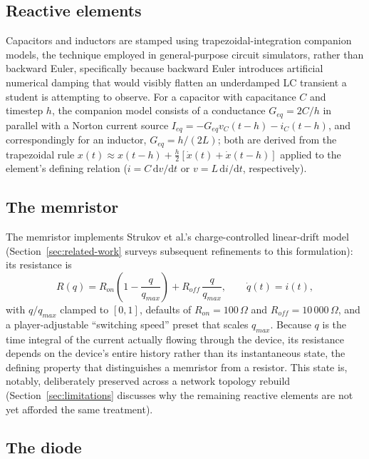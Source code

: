 \subsection{Reactive elements}

Capacitors and inductors are stamped using trapezoidal-integration companion models, the
technique employed in general-purpose circuit simulators, rather than backward Euler,
specifically because backward Euler introduces artificial numerical damping that would
visibly flatten an underdamped LC transient a student is attempting to observe. For a
capacitor with capacitance $C$ and timestep $h$, the companion model consists of a
conductance $G_{eq} = 2C/h$ in parallel with a Norton current source
$I_{eq} = -G_{eq} v_C(t - h) - i_C(t-h)$, and correspondingly for an inductor,
$G_{eq} = h/(2L)$; both are derived from the trapezoidal rule
$x(t) \approx x(t-h) + \frac{h}{2}\left[\dot{x}(t) + \dot{x}(t-h)\right]$ applied to the
element's defining relation ($i = C\,\mathrm{d}v/\mathrm{d}t$ or
$v = L\,\mathrm{d}i/\mathrm{d}t$, respectively).

\subsection{The memristor}

The memristor implements Strukov et al.'s charge-controlled linear-drift
model~\cite{strukov2008missing} (Section~\ref{sec:related-work} surveys subsequent
refinements to this formulation): its resistance is
\begin{equation}
R(q) = R_{on}\left(1 - \frac{q}{q_{max}}\right) + R_{off}\,\frac{q}{q_{max}}, \qquad
\dot{q}(t) = i(t),
\end{equation}
with $q/q_{max}$ clamped to $[0,1]$, defaults of $R_{on}=100\,\Omega$ and
$R_{off}=10\,000\,\Omega$, and a player-adjustable ``switching speed'' preset that scales
$q_{max}$. Because $q$ is the time integral of the current actually flowing through the
device, its resistance depends on the device's entire history rather than its instantaneous
state, the defining property that distinguishes a memristor from a resistor. This state is,
notably, deliberately preserved across a network topology rebuild
(Section~\ref{sec:limitations} discusses why the remaining reactive elements are not yet
afforded the same treatment).

\subsection{The diode}

